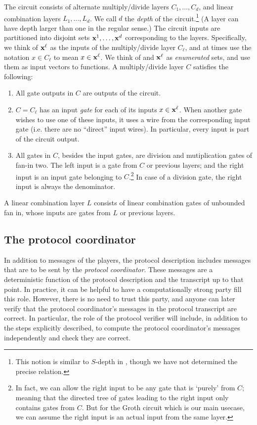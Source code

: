 \documentclass{article}
\begin{document}
The circuit consists of alternate multiply/divide layers $C_1,\ldots,C_d$,
and linear combination layers $L_1,\ldots,L_d$.
We call $d$ the \emph{depth} of the circuit.\footnote{This notion is similar to $S$-depth in \cite{BCGTV15}, though we have not determined the precise relation.}  (A layer can have depth larger than one in the regular sense.) 
The circuit inputs \inp are partitioned into disjoint sets $\mathbf{x}^1,\ldots,\mathbf{x}^d$ corresponding to the layers.
Specifically, we think of $\mathbf{x}^\ell$ as the inputs of the multiply/divide layer $C_\ell$, and at times use the notation
$x\in C_\ell$ to mean $x\in \mathbf{x}^\ell$.
We think of \inp and $\mathbf{x}^\ell$ as \emph{enumerated} sets, and use them as input vectors to functions.
A multiply/divide layer $C$ satisfies the following:
\begin{enumerate}
\item All gate outputs in $C$ are outputs of the circuit.

 \item $C=C_\ell$ has an input \emph{gate} for each of its inputs $x\in \mathbf{x}^\ell$. When another gate wishes to use one of these inputs, it uses a wire from the corresponding input gate (i.e. there are no ``direct'' input wires). In particular,  every input is part of the circuit output.
  
  \item All gates in $C$, besides the input gates, are division and mutiplication gates of fan-in two. The left input is a  gate from $C$ or previous layers;  and the right input is an input gate belonging to $C$.\footnote{In fact, we can allow the right input to be any gate that is `purely' from $C$; meaning that the directed tree of gates leading to the right input only contains gates from $C$. But for the Groth circuit \cite{Groth16} which is our main usecase, we can assume the right input is an actual input from the same layer.} 
  In case of a division gate, the right input is always the denominator.

\end{enumerate}

A linear combination layer $L$ consists of linear combination gates of unbounded fan in, whose inputs are gates from $L$ or previous layers.

\subsection{The protocol coordinator}
In addition to messages of the players, the protocol description includes messages that are to be sent by the \emph{protocol coordinator}.
These messages are a deterministic function of the protocol description and the transcript up to that point.
In practice, it can be helpful to have a computationally strong party fill this role.
However, there is no need to trust this party, and anyone can later verify that the protocol coordinator's messages in the protocol transcript are correct.
In particular, the role of the protocol verifier will include, in addition to the steps explicitly described, to compute the protocol coordinator's messages independently and check they are correct.
\end{document}
